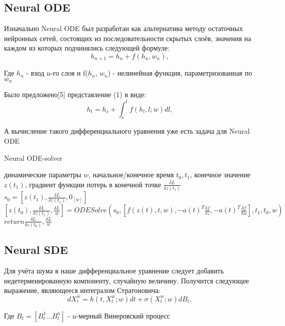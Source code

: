 \documentclass{article}
\begin{document}
   \subsection{Neural ODE}
    \par Изначально Neural ODE был разработан как альтернатива методу остаточных нейронных сетей, состоящих из последовательности скрытых слоёв, значения на каждом из которых подчинялись следующей формуле:
    \begin{equation} h_{n+1} = h_n + f(h_n, w_n),    \end{equation}
    \par Где $h_n$ - вход n-го слоя и f($h_n$, $w_n$) - нелинейная функция, параметризованная по $w_n$
    \par Было предложено[5] представление (1) в виде:
    \begin{equation} h_{t} = h_s + \int_s^t f(h_l, l; w) dl,    \end{equation}
    \par А вычисление такого дифференциального уравнения уже есть задача для Neural ODE

    \begin{algorithm}
     \caption{Neural ODE-solver}\label{alg:cap}
     \begin{algorithmic}
    \Require динамические параметры $w$, начальное/конечное время $t_0,t_1$, конечное значение $z(t_1)$, градиент функции потерь в конечной точке $\frac{\delta L}{\delta z(t_1)}$
    \State $s_0 = [z(t_1), \frac{\delta L}{\delta z(t_1)}, 0_{[w]}]$ 
    \State $[z(t_0), \frac{\delta L}{\delta z(t_1)}, \frac{\delta L}{w}] = ODESolve(s_0, [f(z(t), t, w), -a(t)^T \frac{\delta f}{\delta z}, -a(t)^T \frac{\delta f}{\delta w}], t_1, t_0, w)$
    \State $return \frac{\delta L}{\delta z(t_0)}, \frac{\delta L}{w}$ 
\end{algorithmic}
\end{algorithm}
    
   \subsection{Neural SDE}
      \par Для учёта шума в наше дифференциальное уравнение следует добавить недетерменированную компоненту, случайную величину. Получится следующее выражение, являющееся интегралом Стратоновича:
      \begin{equation} dX_t^w = h(t, X_t^w; w) dt + \sigma(X_t^w;w) dB_t ,    \end{equation}
      \par Где $B_t=[B_t^1...B_t^n]$ - n-мерный Винеровский процесс
\end{document}
